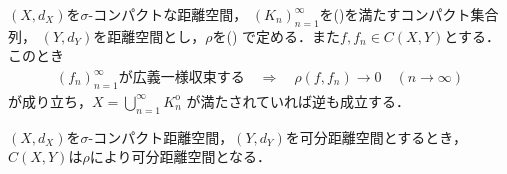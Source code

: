 	\begin{screen}
		\begin{thm}[広義一様収束を定める距離]
			$(X,d_X)$を$\sigma$-コンパクトな距離空間，
			$(K_n)_{n=1}^\infty$を()を満たすコンパクト集合列，
			$(Y,d_Y)$を距離空間とし，$\rho$を()
			で定める．また$f,f_n \in C(X,Y)$とする．このとき
			\begin{align}
				\mbox{$(f_n)_{n=1}^\infty$が広義一様収束する}
				\quad \Longrightarrow \quad
				\rho(f,f_n) \longrightarrow 0
				\quad (n \longrightarrow \infty)
			\end{align}
			が成り立ち，$X = \bigcup_{n=1}^\infty K_n^{\mathrm{o}}$
			が満たされていれば逆も成立する．
		\end{thm}
	\end{screen}
	
	\begin{screen}
		\begin{thm}[$C(X,Y)$の可分性]\label{thm:separability_of_spaces_of_continuous_functions}
			$(X,d_X)$を$\sigma$-コンパクト距離空間，$(Y,d_Y)$を可分距離空間とするとき，$C(X,Y)$は$\rho$により可分距離空間となる．
		\end{thm}
	\end{screen}
	
